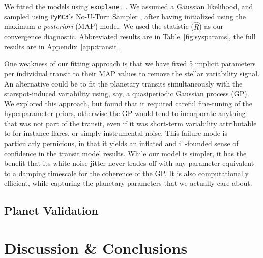 \documentclass[12pt,twocolumn,linenumbers]{aastex63}
\begin{document}
We fitted the models using \texttt{exoplanet}
\citep{exoplanet:exoplanet}.  We assumed a Gaussian likelihood, and
sampled using \texttt{PyMC3}'s No-U-Turn Sampler
\citep{hoffman_no-u-turn_2014}, after having initialized using the
maximum {\it a posteriori} (MAP) model.  We used the
\citet{gelman_inference_1992} statistic ($\hat{R}$) as our convergence
diagnostic.  Abbreviated results are in Table~\ref{fig:sysparams}, the
full results are in Appendix~\ref{app:transit}.

One weakness of our fitting approach is that we have fixed 5 implicit
parameters per individual transit to their MAP values to remove the
stellar variability signal.  An alternative could be to fit the
planetary transits simultaneously with the starspot-induced
variability using, say, a quasiperiodic Gaussian process (GP).  We
explored this approach, but found that it required careful fine-tuning
of the hyperparameter priors, otherwise the GP would tend to
incorporate anything that was not part of the transit, even if it was
short-term variability attributable to for instance flares, or simply
instrumental noise.  This failure mode is particularly pernicious, in
that it yields an inflated and ill-founded sense of confidence in the
transit model results.  While our model is simpler, it has the benefit
that its white noise jitter never trades off with any parameter
equivalent to a damping timescale for the coherence of the GP.  It is
also computationally efficient, while capturing the planetary
parameters that we actually care about.


\subsection{Planet Validation}






\section{Discussion \& Conclusions}
\label{sec:disc_conc}
\end{document}
